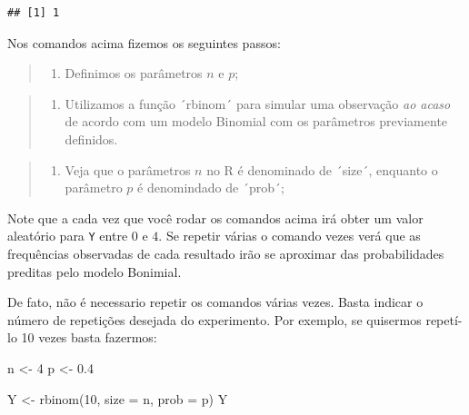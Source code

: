 \documentclass[
]{book}
\newenvironment{Shaded}{\begin{snugshade}}{\end{snugshade}}
\newcommand{\AttributeTok}[1]{\textcolor[rgb]{0.77,0.63,0.00}{#1}}
\newcommand{\DecValTok}[1]{\textcolor[rgb]{0.00,0.00,0.81}{#1}}
\newcommand{\FloatTok}[1]{\textcolor[rgb]{0.00,0.00,0.81}{#1}}
\newcommand{\FunctionTok}[1]{\textcolor[rgb]{0.00,0.00,0.00}{#1}}
\newcommand{\NormalTok}[1]{#1}
\newcommand{\OtherTok}[1]{\textcolor[rgb]{0.56,0.35,0.01}{#1}}
\providecommand{\tightlist}{%
  \setlength{\itemsep}{0pt}\setlength{\parskip}{0pt}}
\begin{document}
\begin{verbatim}
## [1] 1
\end{verbatim}

Nos comandos acima fizemos os seguintes passos:

\begin{quote}
\begin{enumerate}
\def\labelenumi{\arabic{enumi}.}
\tightlist
\item
  Definimos os parâmetros \(n\) e \(p\);
\end{enumerate}
\end{quote}

\begin{quote}
\begin{enumerate}
\def\labelenumi{\arabic{enumi}.}
\setcounter{enumi}{1}
\tightlist
\item
  Utilizamos a função ´rbinom´ para simular uma observação \emph{ao acaso} de acordo com um modelo Binomial com os parâmetros previamente definidos.
\end{enumerate}
\end{quote}

\begin{quote}
\begin{enumerate}
\def\labelenumi{\arabic{enumi}.}
\setcounter{enumi}{2}
\tightlist
\item
  Veja que o parâmetros \(n\) no R é denominado de ´size´, enquanto o parâmetro \(p\) é denomindado de ´prob´;
\end{enumerate}
\end{quote}

Note que a cada vez que você rodar os comandos acima irá obter um valor aleatório para \texttt{Y} entre \(0\) e \(4\). Se repetir várias o comando vezes verá que as frequências observadas de cada resultado irão se aproximar das probabilidades preditas pelo modelo Bonimial.

De fato, não é necessario repetir os comandos várias vezes. Basta indicar o número de repetições desejada do experimento. Por exemplo, se quisermos repetí-lo 10 vezes basta fazermos:

\begin{Shaded}
\begin{Highlighting}[]
\NormalTok{n }\OtherTok{\textless{}{-}} \DecValTok{4}
\NormalTok{p }\OtherTok{\textless{}{-}} \FloatTok{0.4}

\NormalTok{Y }\OtherTok{\textless{}{-}} \FunctionTok{rbinom}\NormalTok{(}\DecValTok{10}\NormalTok{, }\AttributeTok{size =}\NormalTok{ n, }\AttributeTok{prob =}\NormalTok{ p)}
\NormalTok{Y}
\end{Highlighting}
\end{Shaded}
\end{document}
